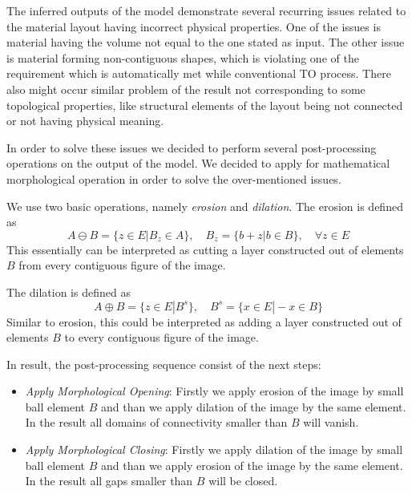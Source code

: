 The inferred outputs of the model demonstrate several recurring issues related to the material layout having incorrect physical properties.
One of the issues is material having the volume not equal to the one stated as input.
The other issue is material forming non-contiguous shapes, which is violating one of the requirement which is automatically met while conventional TO process.
There also might occur similar problem of the result not corresponding to some topological properties, like structural elements of the layout being not connected or not having physical meaning.
\medskip

In order to solve these issues we decided to perform several post-processing operations on the output of the model.
We decided to apply for mathematical morphological operation in order to solve the over-mentioned issues.
\medskip

We use two basic operations, namely \textit{erosion} and \textit{dilation}.
The erosion is defined as 
\begin{equation}
A \ominus B = \{z \in E | B_{z} \in A \}, \quad B_{z}=\{ b+z | b \in B \}, \quad \forall z \in E 
\end{equation} 
This essentially can be interpreted as cutting a layer constructed out of elements $B$ from every contiguous figure of the image.

The dilation is defined as 
\begin{equation}
A \oplus B = \{z \in E | B^{s} \}, \quad B^{s}=\{x \in E | -x \in B \}
\end{equation} 
Similar to erosion, this could be interpreted as adding a layer constructed out of elements $B$ to every contiguous figure of the image. 
\medskip

In result, the post-processing sequence consist of the next steps:
\begin{itemize}
	\item \textit{Apply Morphological Opening}: Firstly we apply erosion of the image by small ball element $B$ and than we apply dilation of the image by the same element. In the result all domains of connectivity smaller than $B$ will vanish.
	\item \textit{Apply Morphological Closing}: Firstly we apply dilation of the image by small ball element $B$ and than we apply erosion of the image by the same element. In the result all gaps smaller than $B$ will be closed.
\end{itemize}



 